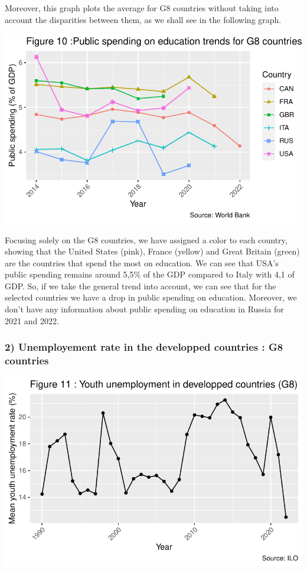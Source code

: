 \documentclass[
  letterpaper,
  DIV=11,
  numbers=noendperiod]{scrartcl}
\begin{document}
Moreover, this graph plots the average for G8 countries without taking
into account the disparities between them, as we shall see in the
following graph.

\includegraphics{Projet-BM_files/figure-pdf/unnamed-chunk-21-1.pdf}

Focusing solely on the G8 countries, we have assigned a color to each
country, showing that the United States (pink), France (yellow) and
Great Britain (green) are the countries that spend the most on
education. We can see that USA's public spending remains around 5,5\% of
the GDP compared to Italy with 4,1 of GDP. So, if we take the general
trend into account, we can see that for the selected countries we have a
drop in public spending on education. Moreover, we don't have any
information about public spending on education in Russia for 2021 and
2022.

\hypertarget{unemployement-rate-in-the-developped-countries-g8-countries}{%
\subsubsection{2) Unemployement rate in the developped countries : G8
countries}\label{unemployement-rate-in-the-developped-countries-g8-countries}}

\includegraphics{Projet-BM_files/figure-pdf/unnamed-chunk-22-1.pdf}
\end{document}
